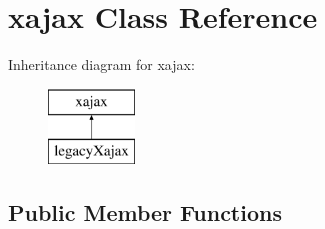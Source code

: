 \hypertarget{classxajax}{
\section{xajax Class Reference}
\label{classxajax}
}
Inheritance diagram for xajax:\begin{figure}[H]
\begin{center}
\leavevmode
\includegraphics[height=2.000000cm]{classxajax}
\end{center}
\end{figure}
\subsection*{Public Member Functions}

